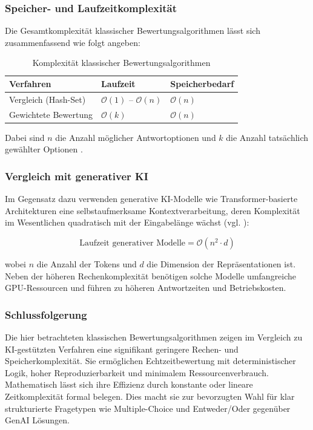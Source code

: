 \documentclass[a4paper,12pt]{article}
\begin{document}
\subsubsection{Speicher- und Laufzeitkomplexität}

Die Gesamtkomplexität klassischer Bewertungsalgorithmen lässt sich zusammenfassend wie folgt angeben:

\begin{table}[h!]
\centering
\begin{tabular}{@{}lll@{}}
\toprule
\textbf{Verfahren} & \textbf{Laufzeit} & \textbf{Speicherbedarf} \\
\midrule
Vergleich (Hash-Set)      & \( \mathcal{O}(1) \) -- \( \mathcal{O}(n) \) & \( \mathcal{O}(n) \) \\
Gewichtete Bewertung      & \( \mathcal{O}(k) \)                         & \( \mathcal{O}(n) \) \\
\bottomrule
\end{tabular}
\caption{Komplexität klassischer Bewertungsalgorithmen}
\end{table}

Dabei sind \( n \) die Anzahl möglicher Antwortoptionen und \( k \) die Anzahl tatsächlich gewählter Optionen \parencite[S. 813]{cormen}.

\subsubsection{Vergleich mit generativer KI}

Im Gegensatz dazu verwenden generative KI-Modelle wie Transformer-basierte Architekturen eine selbstaufmerksame Kontextverarbeitung, deren Komplexität im Wesentlichen quadratisch mit der Eingabelänge wächst (vgl. \textcite{vaswani2017attention}):

\[
\text{Laufzeit generativer Modelle} = \mathcal{O}(n^2 \cdot d)
\]

wobei \( n \) die Anzahl der Tokens und \( d \) die Dimension der Repräsentationen ist. Neben der höheren Rechenkomplexität benötigen solche Modelle umfangreiche GPU-Ressourcen und führen zu höheren Antwortzeiten und Betriebskosten.

\subsubsection{Schlussfolgerung}

Die hier betrachteten klassischen Bewertungsalgorithmen zeigen im Vergleich zu KI-gestützten Verfahren eine signifikant geringere Rechen- und Speicherkomplexität. Sie ermöglichen Echtzeitbewertung mit deterministischer Logik, hoher Reproduzierbarkeit und minimalem Ressourcenverbrauch. Mathematisch lässt sich ihre Effizienz durch konstante oder lineare Zeitkomplexität formal belegen. Dies macht sie zur bevorzugten Wahl für klar strukturierte Fragetypen wie Multiple-Choice und Entweder/Oder gegenüber GenAI Lösungen.
\newpage
\end{document}
